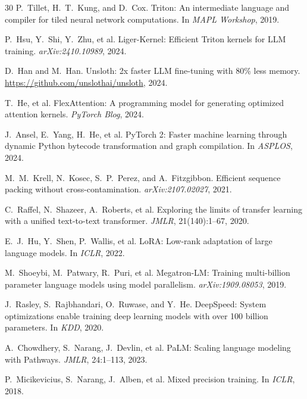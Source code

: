 \documentclass[11pt,a4paper]{article}
\begin{document}
\begin{thebibliography}{30}
P.~Tillet, H.~T.~Kung, and D.~Cox.
\newblock Triton: An intermediate language and compiler for tiled neural network computations.
\newblock In \emph{MAPL Workshop}, 2019.

P.~Hsu, Y.~Shi, Y.~Zhu, et al.
\newblock Liger-Kernel: Efficient Triton kernels for LLM training.
\newblock \emph{arXiv:2410.10989}, 2024.

D.~Han and M.~Han.
\newblock Unsloth: 2x faster LLM fine-tuning with 80\% less memory.
\newblock \url{https://github.com/unslothai/unsloth}, 2024.

T.~He, et al.
\newblock FlexAttention: A programming model for generating optimized attention kernels.
\newblock \emph{PyTorch Blog}, 2024.

J.~Ansel, E.~Yang, H.~He, et al.
\newblock PyTorch 2: Faster machine learning through dynamic Python bytecode transformation and graph compilation.
\newblock In \emph{ASPLOS}, 2024.

M.~M.~Krell, N.~Kosec, S.~P.~Perez, and A.~Fitzgibbon.
\newblock Efficient sequence packing without cross-contamination.
\newblock \emph{arXiv:2107.02027}, 2021.

C.~Raffel, N.~Shazeer, A.~Roberts, et al.
\newblock Exploring the limits of transfer learning with a unified text-to-text transformer.
\newblock \emph{JMLR}, 21(140):1--67, 2020.

E.~J.~Hu, Y.~Shen, P.~Wallis, et al.
\newblock LoRA: Low-rank adaptation of large language models.
\newblock In \emph{ICLR}, 2022.

M.~Shoeybi, M.~Patwary, R.~Puri, et al.
\newblock Megatron-LM: Training multi-billion parameter language models using model parallelism.
\newblock \emph{arXiv:1909.08053}, 2019.

J.~Rasley, S.~Rajbhandari, O.~Ruwase, and Y.~He.
\newblock DeepSpeed: System optimizations enable training deep learning models with over 100 billion parameters.
\newblock In \emph{KDD}, 2020.

A.~Chowdhery, S.~Narang, J.~Devlin, et al.
\newblock PaLM: Scaling language modeling with Pathways.
\newblock \emph{JMLR}, 24:1--113, 2023.

P.~Micikevicius, S.~Narang, J.~Alben, et al.
\newblock Mixed precision training.
\newblock In \emph{ICLR}, 2018.

\end{thebibliography}
\end{document}
